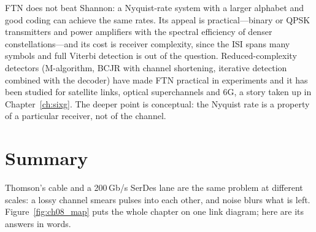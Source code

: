 FTN does not beat Shannon: a Nyquist-rate system with a larger alphabet and good coding can
achieve the same rates. Its appeal is practical---binary or QPSK transmitters and power amplifiers
with the spectral efficiency of denser constellations---and its cost is receiver complexity, since
the ISI spans many symbols and full Viterbi detection is out of the question. Reduced-complexity
detectors (M-algorithm, BCJR with channel shortening, iterative detection combined with the
decoder) have made FTN practical in experiments and it has been studied for satellite links,
optical superchannels and 6G, a story taken up in Chapter~\ref{ch:sixg}. The deeper point is
conceptual: the Nyquist rate is a property of a particular receiver, not of the channel.

\section{Summary}

Thomson's cable and a 200\,Gb/s SerDes lane are the same problem at different scales: a lossy
channel smears pulses into each other, and noise blurs what is left. Figure~\ref{fig:ch08_map}
puts the whole chapter on one link diagram; here are its answers in words.

